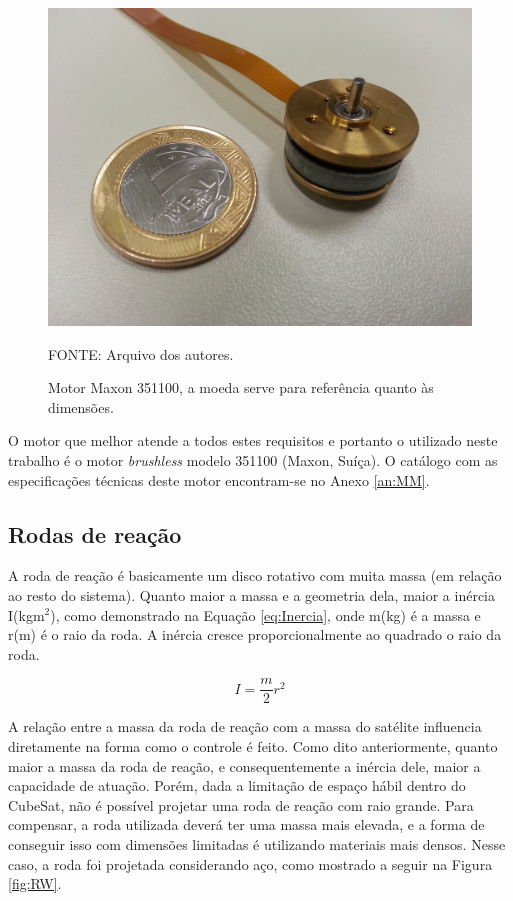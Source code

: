 \documentclass[
	12pt,				%
	openany,			%
	twoside,			%
	a4paper,			%
	english,			%
	french,				%
	spanish,			%
	brazil,				%
	oldfontcommands
	]{abntex2}
\begin{document}
\begin{figure}[th]
	\caption{Motor Maxon 351100, a moeda serve para referência quanto às dimensões.}
	\centering
	\includegraphics[width=0.6\linewidth]{./figs/Maxon_351100}
	
	\begin{small}
		FONTE: Arquivo dos autores.
	\end{small}
	\label{fig:Maxon}
\end{figure}


O motor que melhor atende a todos estes requisitos e portanto o utilizado neste trabalho é o motor \textit{brushless} modelo 351100 (Maxon, Suíça). O catálogo com as especificações técnicas deste motor encontram-se no Anexo \ref{an:MM}.


\subsection{Rodas de reação}

A roda de reação é basicamente um disco rotativo com muita massa (em relação ao resto do sistema). Quanto maior a massa e a geometria dela, maior a inércia I(kgm$^{2}$), como demonstrado na Equação \ref{eq:Inercia}, onde m(kg) é a massa e r(m) é o raio da roda. A inércia cresce proporcionalmente ao quadrado o raio da roda.

\begin{equation}
I = \frac{m}{2} r^2
\label{eq:Inercia}
\end{equation}

A relação entre a massa da roda de reação com a massa do satélite influencia diretamente na forma como o controle é feito. Como dito anteriormente, quanto maior a massa da roda de reação, e consequentemente a inércia dele, maior a capacidade de atuação. Porém, dada a limitação de espaço hábil dentro do CubeSat, não é possível projetar uma roda de reação com raio grande. Para compensar, a roda utilizada deverá ter uma massa mais elevada, e a forma de conseguir isso com dimensões limitadas é utilizando materiais mais densos. Nesse caso, a roda foi projetada considerando aço, como mostrado a seguir na Figura \ref{fig:RW}.
\end{document}
